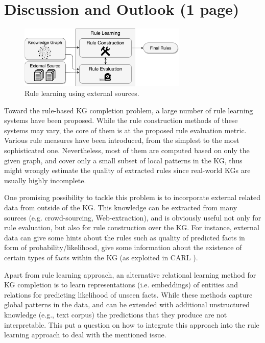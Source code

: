 \section{Discussion and Outlook (1 page)}
\label{sec:discussion_outlook}
\begin{figure}[t]
\centering
\includegraphics[width=8cm]{figures/discussion_overview}
\caption{Rule learning using external sources.}
\label{fig:discussion_overview}
\end{figure}
Toward the rule-based KG completion problem, a large number of rule learning systems have been proposed. While the rule construction methods of these systems may vary, the core of them is at the proposed rule evaluation metric. Various rule measures have been introduced, from the simplest to the most sophisticated one. Nevertheless, most of them are computed based on only the given graph, and cover only a small subset of local patterns in the KG, thus might wrongly estimate the quality of extracted rules since real-world KGs are usually highly incomplete.

One promising possibility to tackle this problem is to incorporate external related data from outside of the KG. This knowledge can be extracted from many sources (e.g. crowd-sourcing, Web-extraction), and is obviously useful not only for rule evaluation, but also for rule construction over the KG. For instance, external data can give some hints about the rules such as quality of predicted facts in form of probability/likelihood, give some information about the existence of certain types of facts within the KG (as exploited in CARL \cite{carl}).

Apart from rule learning approach, an alternative relational learning method for KG completion is to
learn representations (i.e. embeddings) of entities and relations for predicting likelihood of unseen facts. 
While these methods capture global patterns in the data, and can be extended with additional unstructured knowledge (e.g., text corpus) the predictions that they produce are not interpretable. This put a question on how to integrate this approach into the rule learning approach to deal with the mentioned issue.
